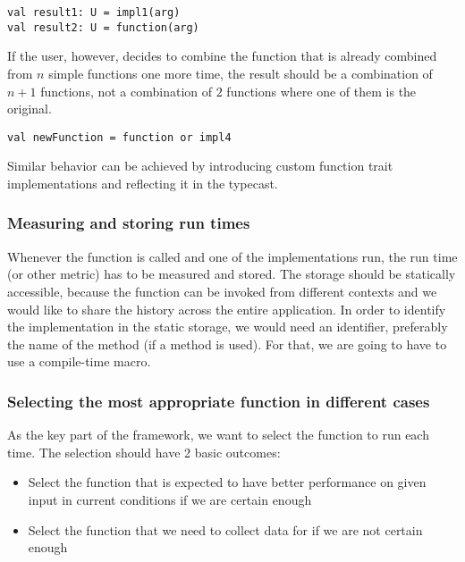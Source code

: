 \lstset{style=Scala}
\begin{lstlisting}
val result1: U = impl1(arg)
val result2: U = function(arg)
\end{lstlisting}

If the user, however, decides to combine the function that is already combined from $n$ simple functions one more time, the result should be a combination of $n+1$ functions, not a combination of $2$ functions where one of them is the original.

\lstset{style=Scala}
\begin{lstlisting}
val newFunction = function or impl4
\end{lstlisting}

Similar behavior can be achieved by introducing custom function trait implementations and reflecting it in the typecast.

\subsubsection{Measuring and storing run times}

Whenever the function is called and one of the implementations run, the run time (or other metric) has to be measured and stored. The storage should be statically accessible, because the function can be invoked from different contexts and we would like to share the history across the entire application. In order to identify the implementation in the static storage, we would need an identifier, preferably the name of the method (if a method is used). For that, we are going to have to use a compile-time macro.

\subsubsection{Selecting the most appropriate function in different cases}

As the key part of the framework, we want to select the function to run each time. The selection should have 2 basic outcomes:

\begin{itemize}
	\item Select the function that is expected to have better performance on given input in current conditions if we are certain enough
	\item Select the function that we need to collect data for if we are not certain enough
\end{itemize}

